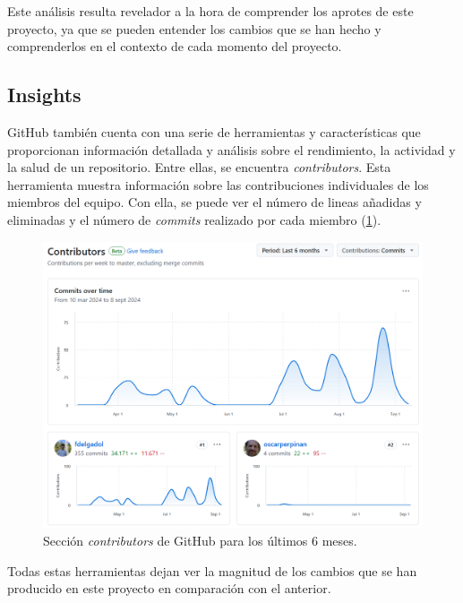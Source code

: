 Este análisis resulta revelador a la hora de comprender los aprotes de este proyecto, ya que se pueden entender los cambios que se han hecho y comprenderlos en el contexto de cada momento del proyecto.

\subsection{Insights}
\label{sec:org204ee88}
GitHub también cuenta con una serie de herramientas y características que proporcionan información detallada y análisis sobre el rendimiento, la actividad y la salud de un repositorio. Entre ellas, se encuentra \emph{contributors}. Esta herramienta muestra información sobre las contribuciones individuales de los miembros del equipo. Con ella, se puede ver el número de lineas añadidas y eliminadas y el número de \emph{commits} realizado por cada miembro (\ref{fig:contributors}).
\begin{figure}[htbp]
\centering
\includegraphics[width=.9\linewidth]{figuras/contributors.png}
\caption{Sección \emph{contributors} de GitHub para los últimos 6 meses. \label{fig:contributors}}
\end{figure}

Todas estas herramientas dejan ver la magnitud de los cambios que se han producido en este proyecto en comparación con el anterior.

